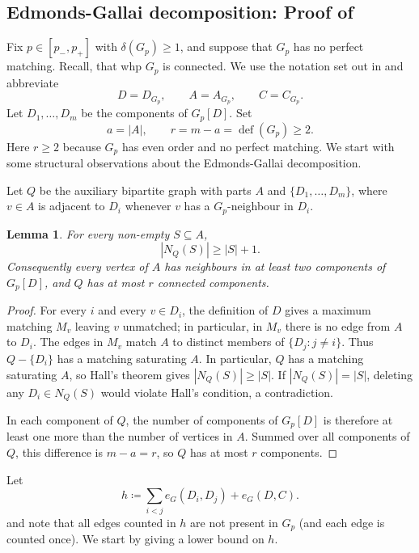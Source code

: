 \documentclass[10pt,a4paper]{article}
\newtheorem{lemma}[thm]{Lemma}
\newcommand{\defi}{\operatorname{def}}
\begin{document}
\subsection{Edmonds-Gallai decomposition: Proof of }


Fix $p\in[p_-,p_+]$ with $\delta(G_p)\ge1$, and suppose that $G_p$ has no perfect matching. Recall, that whp $G_p$ is connected. %
We use the notation set out in  and abbreviate
\[
 D=D_{G_p},\qquad A=A_{G_p},\qquad C=C_{G_p}.
\]
Let $D_1,\ldots,D_m$ be the components of $G_p[D]$.
Set
\[
 a=|A|,\qquad r=m-a=\defi(G_p)\ge2.
\]
Here $r\ge2$ because $G_p$ has even order and no perfect matching.
We start with some structural observations about the Edmonds-Gallai decomposition.

Let $Q$ be the auxiliary bipartite graph with parts $A$ and $\{D_1,\ldots,D_m\}$, where $v\in A$ is adjacent to $D_i$ whenever $v$ has a $G_p$-neighbour in $D_i$.

\begin{lemma}\label{lem:strict-hall}
For every non-empty $S\subseteq A$,
\[
 |N_Q(S)|\ge|S|+1.
\]
Consequently every vertex of $A$ has neighbours in at least two components of $G_p[D]$, and $Q$ has at most $r$ connected components.
\end{lemma}

\begin{proof}
For every $i$ and every $v\in D_i$, the definition of $D$ gives a maximum matching $M_v$ leaving $v$ unmatched; in particular, in $M_v$ there is no edge from $A$ to $D_i$. 
The edges in $M_v$ match $A$ to distinct members of $\{D_j:j\ne i\}$.
Thus $Q-\{D_i\}$ has a matching saturating $A$.
In particular, $Q$ has a matching saturating $A$, so Hall's theorem gives $|N_Q(S)|\ge|S|$.
If $|N_Q(S)|=|S|$, deleting any $D_i\in N_Q(S)$ would violate Hall's condition, a contradiction.

In each component of $Q$, the number of components of $G_p[D]$ is therefore at least one more than the number of vertices in $A$.
Summed over all components of $Q$, this difference is $m-a=r$, so $Q$ has at most $r$ components.
\end{proof}

Let
\[
 h\coloneqq \sum_{i<j}e_G(D_i,D_j)+e_G(D,C).
\]
and note that all edges counted in $h$ are not present in $G_p$ (and each edge is counted once).
We start by giving a lower bound on $h$.
\end{document}
